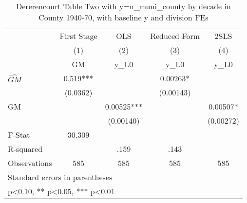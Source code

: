 \begin{table}[htbp]\centering
\def\sym#1{\ifmmode^{#1}\else\(^{#1}\)\fi}
\caption{Dererencourt Table Two with y=n\_muni\_county by decade in County 1940-70, with baseline y and division FEs}
\begin{tabular}{l*{4}{c}}
\toprule
                    & First Stage   &         OLS   &Reduced Form   &        2SLS   \\
                    &\multicolumn{1}{c}{(1)}&\multicolumn{1}{c}{(2)}&\multicolumn{1}{c}{(3)}&\multicolumn{1}{c}{(4)}\\
                    &\multicolumn{1}{c}{GM}&\multicolumn{1}{c}{y\_L0}&\multicolumn{1}{c}{y\_L0}&\multicolumn{1}{c}{y\_L0}\\
\midrule
$\hat{GM}$          &       0.519***&               &     0.00263*  &               \\
                    &    (0.0362)   &               &   (0.00143)   &               \\
\addlinespace
GM                  &               &     0.00525***&               &     0.00507*  \\
                    &               &   (0.00140)   &               &   (0.00272)   \\
\midrule
F-Stat              &      30.309   &               &               &               \\
R-squared           &               &        .159   &        .143   &               \\
Observations        &         585   &         585   &         585   &         585   \\
\bottomrule
\multicolumn{5}{l}{\footnotesize Standard errors in parentheses}\\
\multicolumn{5}{l}{\footnotesize * p<0.10, ** p<0.05, *** p<0.01}\\
\end{tabular}
\end{table}
